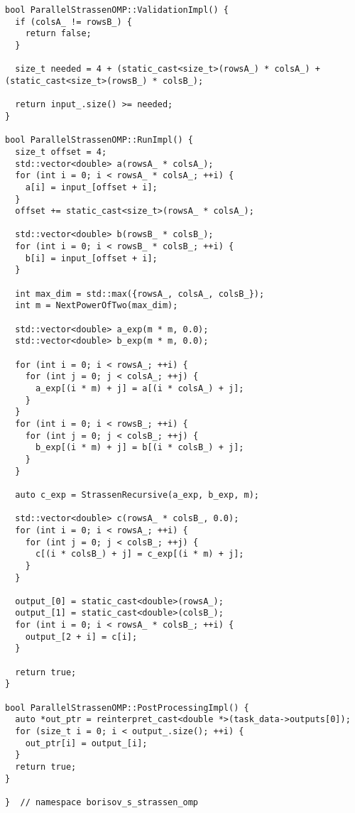 \documentclass[12pt]{article}
\begin{document}
\begin{lstlisting}
bool ParallelStrassenOMP::ValidationImpl() {
  if (colsA_ != rowsB_) {
    return false;
  }

  size_t needed = 4 + (static_cast<size_t>(rowsA_) * colsA_) + (static_cast<size_t>(rowsB_) * colsB_);

  return input_.size() >= needed;
}

bool ParallelStrassenOMP::RunImpl() {
  size_t offset = 4;
  std::vector<double> a(rowsA_ * colsA_);
  for (int i = 0; i < rowsA_ * colsA_; ++i) {
    a[i] = input_[offset + i];
  }
  offset += static_cast<size_t>(rowsA_ * colsA_);

  std::vector<double> b(rowsB_ * colsB_);
  for (int i = 0; i < rowsB_ * colsB_; ++i) {
    b[i] = input_[offset + i];
  }

  int max_dim = std::max({rowsA_, colsA_, colsB_});
  int m = NextPowerOfTwo(max_dim);

  std::vector<double> a_exp(m * m, 0.0);
  std::vector<double> b_exp(m * m, 0.0);

  for (int i = 0; i < rowsA_; ++i) {
    for (int j = 0; j < colsA_; ++j) {
      a_exp[(i * m) + j] = a[(i * colsA_) + j];
    }
  }
  for (int i = 0; i < rowsB_; ++i) {
    for (int j = 0; j < colsB_; ++j) {
      b_exp[(i * m) + j] = b[(i * colsB_) + j];
    }
  }

  auto c_exp = StrassenRecursive(a_exp, b_exp, m);

  std::vector<double> c(rowsA_ * colsB_, 0.0);
  for (int i = 0; i < rowsA_; ++i) {
    for (int j = 0; j < colsB_; ++j) {
      c[(i * colsB_) + j] = c_exp[(i * m) + j];
    }
  }

  output_[0] = static_cast<double>(rowsA_);
  output_[1] = static_cast<double>(colsB_);
  for (int i = 0; i < rowsA_ * colsB_; ++i) {
    output_[2 + i] = c[i];
  }

  return true;
}

bool ParallelStrassenOMP::PostProcessingImpl() {
  auto *out_ptr = reinterpret_cast<double *>(task_data->outputs[0]);
  for (size_t i = 0; i < output_.size(); ++i) {
    out_ptr[i] = output_[i];
  }
  return true;
}

}  // namespace borisov_s_strassen_omp
\end{lstlisting}
\end{document}
